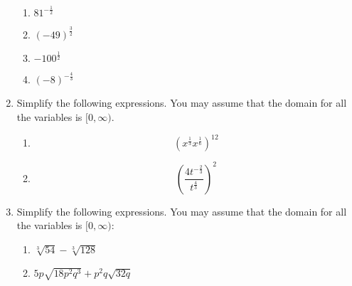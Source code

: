 \documentclass[letterpaper,12pt,fleqn]{article}
\begin{document}
\begin{enumerate}
\begin{enumerate}
  \item $81^{-\frac{1}{2}}$

    \vspace{1in}
    
  \item $(-49)^{\frac{3}{2}}$

    \vspace{1in}
    
  \item $-100^{\frac{1}{2}}$

    \vspace{1in}
    
  \item $(-8)^{-\frac{4}{3}}$

    \vspace{1in}
    
  \end{enumerate}

  \newpage

\item Simplify the following expressions. You may assume that the domain for all the
  variables is $[0,\infty)$.
  \begin{enumerate}
  \item \[\left(x^{\frac{1}{3}}x^{\frac{1}{6}}\right)^{12}\]

    \vspace{3in}
      
  \item \[\left(\frac{4t^{-\frac{2}{3}}}{t^{\frac{4}{3}}}\right)^2\]

    \vspace{3in}
      
  \end{enumerate}

  \newpage
  
\item Simplify the following expressions. You may assume that the domain for all the
  variables is $[0,\infty)$:
  \begin{enumerate}
  \item $\sqrt[3]{54}-\sqrt[3]{128}$

    \vspace{3in}
      
  \item $5p\sqrt{18p^2q^3}+p^2q\sqrt{32q}$

    \vspace{3in}
      
  \end{enumerate}


\end{enumerate}
\end{document}
